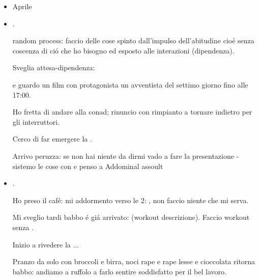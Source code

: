 \begin{itemize}
loquor: .

Intanto venga luned\'i - questo luned\'i sono a Siena - tutti i luned\'i \'e a Siena? - Stato d'animo: non contrastare interlocutore.

Non ricordo con quale stato d'animo sia tornato a eigenlab - agitazione vergogna .

Stato d'animo post pranzo:  - vedi insicurezza annuncio interpretazione miei gesti.

Penso se prenotare qualche esame: stato d'animo .

Eccitazione partenza diventa sonno-stanchezza durante il tragitto: alla peruzza .

\item Aprile

\item {}.

random process: faccio delle cose spinto dall'impulso dell'abitudine cio\'e senza coscenza di ci\'o che ho bisogno ed esposto alle interazioni (dipendenza).

Sveglia attesa-dipendenza: 

e guardo un film con protagonista un avventista del settimo giorno fino alle 17:00.

Ho fretta di andare alla conad; rinuncio con rimpianto a tornare indietro per gli interruttori.

Cerco di far emergere la .

Arrivo peruzza: se non hai niente da dirmi vado a fare la presentazione - sistemo le cose con  e penso a Addominal assoult

\item {}.

Ho preso il caf\'e: mi addormento verso le 2: , non faccio niente che mi serva.

Mi sveglio tardi babbo \'e gi\'a arrivato:  (workout descrizione). Faccio workout senza .

Inizio a rivedere la  ...

Pranzo da solo con broccoli e birra, noci rape e rape lesse e cioccolata ritorna babbo: andiamo a ruffolo a farlo sentire soddisfatto per il bel lavoro.


\end{itemize}
